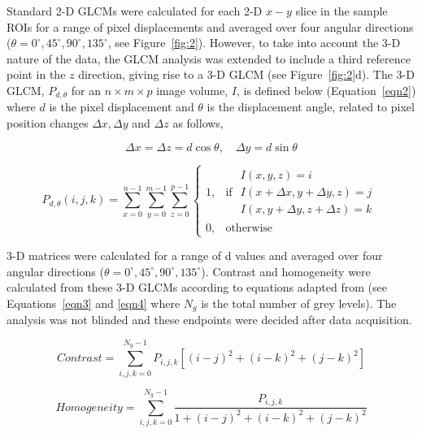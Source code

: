 	Standard 2-D GLCMs were calculated for each 2-D $x-y$ slice in the sample ROIs for a range of pixel displacements and averaged over four angular directions ($\theta = 0^{\circ}, 45^{\circ}, 90^{\circ}, 135^{\circ}$, see Figure~\ref{fig:2}). \cite{haralicktextural1973} However, to take into account the 3-D nature of the data, the GLCM analysis was extended to include a third reference point in the $z$ direction, giving rise to a 3-D GLCM (see Figure~\ref{fig:2}d). The 3-D GLCM, $P_{d,\theta}$ for an $n \times m \times p$ image volume, $I$, is defined below (Equation~\ref{eqn2}) where $d$ is the pixel displacement and $\theta$ is the displacement angle, related to pixel position changes $\Delta x, \Delta y$  and $\Delta z$  as follows,   
	
	\begin{equation} \label{eqn1}
	\Delta x = \Delta z = d \cos \theta , \quad \Delta y = d \sin \theta
	\end{equation}                        
	
	\begin{equation}\label{eqn2}
	P_{d,\theta}(i,j,k)= \sum_{x=0}^{n-1} \sum_{y=0}^{m-1} \sum_{z=0}^{p-1} \begin{cases} 1, &\mbox{if } 
	\begin{array}{l} 
	I(x,y,z)=i \\
	I(x+\Delta x,y +\Delta y,z)=j \\
	I(x,y+\Delta y,z+\Delta z)=k 
	\end{array} \\
	0, & \mbox{otherwise}  \end{cases}
	\end{equation}
	
	3-D matrices were calculated for a range of d values and averaged over four angular directions ($\theta = 0^{\circ}, 45^{\circ}, 90^{\circ}, 135^{\circ}$). Contrast and homogeneity were calculated from these 3-D GLCMs according to equations adapted from \cite{cheniris2009} (see Equations~\ref{eqn3} and \ref{eqn4} where $N_g$ is the total number of grey levels). The analysis was not blinded and these endpoints were decided after data acquisition.
	
	\begin{equation}\label{eqn3}
	Contrast = \sum_{i,j,k=0}^{N_g-1} P_{i,j,k}[(i-j)^2+(i-k)^2+(j-k)^2]
	\end{equation}
	
	\begin{equation}\label{eqn4}
	Homogeneity = \sum_{i,j,k=0}^{N_g-1} \frac{P_{i,j,k}}{1+(i-j)^2+(i-k)^2+(j-k)^2}
	\end{equation}
	
